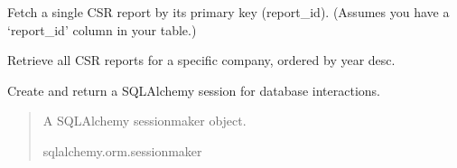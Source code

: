 \documentclass[letterpaper,10pt,english]{sphinxmanual}
\begin{document}
\begin{fulllineitems}
\begin{fulllineitems}
\end{fulllineitems}


\begin{fulllineitems}
\label{\detokenize{src.database:src.database.postgres.PostgreSQLDB.get_csr_report_by_id}}
\pysigstartsignatures
\pysiglinewithargsret
{}
{}
{}
\pysigstopsignatures
\sphinxAtStartPar
Fetch a single CSR report by its primary key (report\_id).
(Assumes you have a ‘report\_id’ column in your table.)

\end{fulllineitems}


\begin{fulllineitems}
\label{\detokenize{src.database:src.database.postgres.PostgreSQLDB.get_csr_reports_by_company}}
\pysigstartsignatures
\pysiglinewithargsret
{}
{}
{}
\pysigstopsignatures
\sphinxAtStartPar
Retrieve all CSR reports for a specific company, ordered by year desc.

\end{fulllineitems}


\begin{fulllineitems}
\label{\detokenize{src.database:src.database.postgres.PostgreSQLDB.session}}
\pysigstartsignatures
\pysigline
{}
\pysigstopsignatures
\sphinxAtStartPar
Create and return a SQLAlchemy session for database interactions.
\begin{quote}\begin{description}
\sphinxAtStartPar
A SQLAlchemy sessionmaker object.

\sphinxAtStartPar
sqlalchemy.orm.sessionmaker


\end{description}
\end{quote}
\end{fulllineitems}
\end{fulllineitems}
\end{document}
